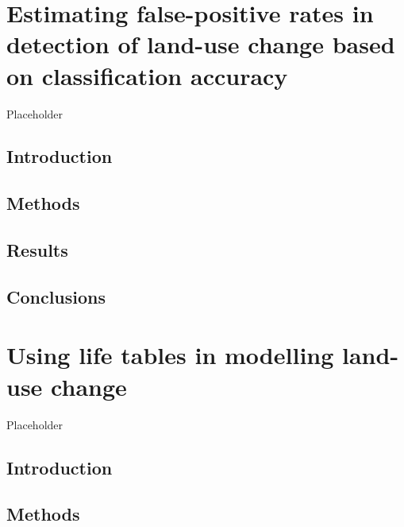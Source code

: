 \documentclass[
]{book}
\begin{document}
\hypertarget{estimating-false-positive-rates-in-detection-of-land-use-change-based-on-classification-accuracy}{%
\chapter{Estimating false-positive rates in detection of land-use change based on classification accuracy}\label{estimating-false-positive-rates-in-detection-of-land-use-change-based-on-classification-accuracy}}

Placeholder

\hypertarget{introduction-4}{%
\section{Introduction}\label{introduction-4}}

\hypertarget{methods-3}{%
\section{Methods}\label{methods-3}}

\hypertarget{results-3}{%
\section{Results}\label{results-3}}

\hypertarget{conclusions-1}{%
\section{Conclusions}\label{conclusions-1}}

\hypertarget{using-life-tables-in-modelling-land-use-change}{%
\chapter{Using life tables in modelling land-use change}\label{using-life-tables-in-modelling-land-use-change}}

Placeholder

\hypertarget{introduction-5}{%
\section{Introduction}\label{introduction-5}}

\hypertarget{methods-4}{%
\section{Methods}\label{methods-4}}
\end{document}
